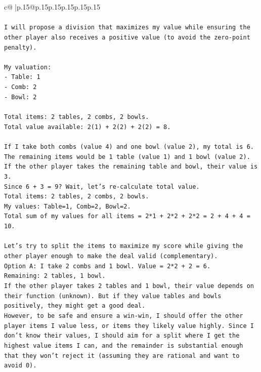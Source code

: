 \documentclass{article}
\begin{document}
{\begin{supertabular}{c@{$\;$}|p{.15\linewidth}@{}p{.15\linewidth}p{.15\linewidth}p{.15\linewidth}p{.15\linewidth}p{.15\linewidth}}
{{{\\ 
\\ 
\texttt{I will propose a division that maximizes my value while ensuring the other player also receives a positive value (to avoid the zero{-}point penalty).} \\
\\ 
\texttt{My valuation:} \\
\texttt{{-} Table: 1} \\
\texttt{{-} Comb: 2} \\
\texttt{{-} Bowl: 2} \\
\\ 
\texttt{Total items: 2 tables, 2 combs, 2 bowls.} \\
\texttt{Total value available: 2(1) + 2(2) + 2(2) = 8.} \\
\\ 
\texttt{If I take both combs (value 4) and one bowl (value 2), my total is 6.} \\
\texttt{The remaining items would be 1 table (value 1) and 1 bowl (value 2).} \\
\texttt{If the other player takes the remaining table and bowl, their value is 3.} \\
\texttt{Since 6 + 3 = 9? Wait, let's re{-}calculate total value.} \\
\texttt{Total items: 2 tables, 2 combs, 2 bowls.} \\
\texttt{My values: Table=1, Comb=2, Bowl=2.} \\
\texttt{Total sum of my values for all items = 2*1 + 2*2 + 2*2 = 2 + 4 + 4 = 10.} \\
\\ 
\texttt{Let's try to split the items to maximize my score while giving the other player enough to make the deal valid (complementary).} \\
\texttt{Option A: I take 2 combs and 1 bowl. Value = 2*2 + 2 = 6.} \\
\texttt{Remaining: 2 tables, 1 bowl.} \\
\texttt{If the other player takes 2 tables and 1 bowl, their value depends on their function (unknown). But if they value tables and bowls positively, they might get a good deal.} \\
\texttt{However, to be safe and ensure a win{-}win, I should offer the other player items I value less, or items they likely value highly. Since I don't know their values, I should aim for a split where I get the highest value items I can, and the remainder is substantial enough that they won't reject it (assuming they are rational and want to avoid 0).} \\
}}}
\end{supertabular}}
\end{document}
